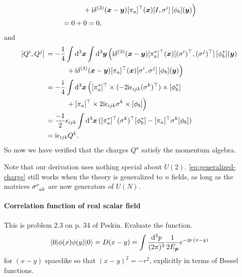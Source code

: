 \documentclass[hyperref, a4paper]{article}
\newcommand*{\ii}{\mathrm{i}}
\begin{document}
\begin{itemize}
\[\begin{aligned}
            &\quad \quad \quad + \ii \delta^{(3)}(\vb*{x} - \vb*{y}) [\pi_a]^\top(\vb*{x}) \comm*{I}{\sigma^i} [\phi_b](\vb*{y}) \Big) \\
            &= 0 + 0 = 0,
        \end{aligned}
    \]
    and 
    \[
        \begin{aligned}
            \comm*{Q^i}{Q^j} &= - \frac{1}{4} \int \dd[3]{\vb*{x}} \int \dd[3]{\vb*{y}} \Big( \ii \delta^{(3)}(\vb*{x} - \vb*{y}) [\pi^*_a]^\top(\vb*{x}) \comm*{(\sigma^i)^\top}{(\sigma^j)^\top} [\phi^*_b](\vb*{y}) \\
            &\quad \quad \quad + \ii \delta^{(3)}(\vb*{x} - \vb*{y}) [\pi_a]^\top(\vb*{x}) \comm*{\sigma^i}{\sigma^j} [\phi_b](\vb*{y}) \Big) \\
            &= - \frac{\ii}{4} \int \dd[3]{\vb*{x}} \Big( [\pi^*_a]^\top \times (- 2 \ii \epsilon_{ijk} (\sigma^k)^\top) \times [\phi^*_b] \\
            &\quad \quad \quad + [\pi_a]^\top \times 2 \ii \epsilon_{ijk} \sigma^k \times [\phi_b] \Big) \\
            &= \frac{-1}{2} \epsilon_{ijk} \int \dd[3]{\vb*{x}} ( [\pi^*_a]^\top (\sigma^k)^\top [\phi^*_b] - [\pi_a]^\top \sigma^k [\phi_b]) \\
            &= \ii \epsilon_{ijk} Q^k.
        \end{aligned}
    \]
    So now we have verified that the charges $Q^a$ satisfy the momentum algebra.

    Note that our derivation uses nothing special about $U(2)$. 
    \eqref{eq:generalized-charge} still works when the theory is generalized to $n$ fields, as long as the matrices $\sigma\indices{^\nu_{ab}}$ are now generators of $U(N)$. 
\end{itemize}

\paragraph{}

\paragraph{Correlation function of real scalar field} This is problem $2.3$ on p. 34 of Peskin. Evaluate the function. 
\[
\langle 0|\phi(x) \phi(y)| 0\rangle=D(x-y)=\int \frac{\dd^{3} p}{(2 \pi)^{3}} \frac{1}{2 E_{\vb*{p}}} e^{-\ii p \cdot (x-y)}
\]
for $(x-y)$ spacelike so that $(x-y)^{2}=-r^{2}$, explicitly in terms of Bessel functions.
\end{document}
